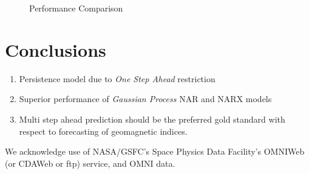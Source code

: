 \documentclass[referee,a4paper,12pt,traditabstract]{swsc}
\begin{document}
\begin{linenumbers}
\begin{figure}
   \centering
   \vspace{12pt}
   \caption{\small  Performance Comparison} 
   \label{fig:deltaDst}
   \end{figure}

\section{Conclusions}

   \begin{enumerate}
      \item Persistence model due to \emph{One Step Ahead} restriction 
      \item Superior performance of \emph{Gaussian Process} NAR and NARX models
      \item Multi step ahead prediction should be the preferred gold standard with respect to forecasting of geomagnetic indices.
   \end{enumerate}

\begin{acknowledgements}
      We acknowledge use of NASA/GSFC's Space Physics Data Facility's OMNIWeb (or CDAWeb or ftp) service, and OMNI data.
\end{acknowledgements}




\end{linenumbers}
\end{document}
